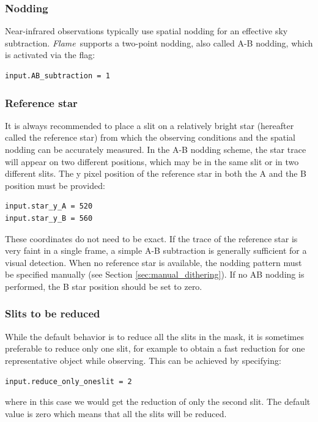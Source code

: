 \documentclass[a4paper]{article}
\newcommand{\flame}{\emph{Flame}}
\begin{document}
\begin{sloppypar}
\subsubsection{Nodding}
Near-infrared observations typically use spatial nodding for an effective sky subtraction. \flame\ supports a two-point nodding, also called A-B nodding, which is activated via the flag:
\begin{lstlisting}
input.AB_subtraction = 1
\end{lstlisting}

\subsubsection{Reference star}
It is always recommended to place a slit on a relatively bright star (hereafter called the reference star) from which the observing conditions and the spatial nodding can be accurately measured. In the A-B nodding scheme, the star trace will appear on two different positions, which may be in the same slit or in two different slits. The y pixel position of the reference star in both the A and the B position must be provided:
\begin{lstlisting}
input.star_y_A = 520
input.star_y_B = 560
\end{lstlisting}
These coordinates do not need to be exact. If the trace of the reference star is very faint in a single frame, a simple A-B subtraction is generally sufficient for a visual detection. When no reference star is available, the nodding pattern must be specified manually (see Section \ref{sec:manual_dithering}). If no AB nodding is performed, the B star position should be set to zero.

\subsubsection{Slits to be reduced}
While the default behavior is to reduce all the slits in the mask, it is sometimes preferable to reduce only one slit, for example to obtain a fast reduction for one representative object while observing. This can be achieved by specifying:
\begin{lstlisting}
input.reduce_only_oneslit = 2
\end{lstlisting}
where in this case we would get the reduction of only the second slit. The default value is zero which means that all the slits will be reduced.


\end{sloppypar}
\end{document}
